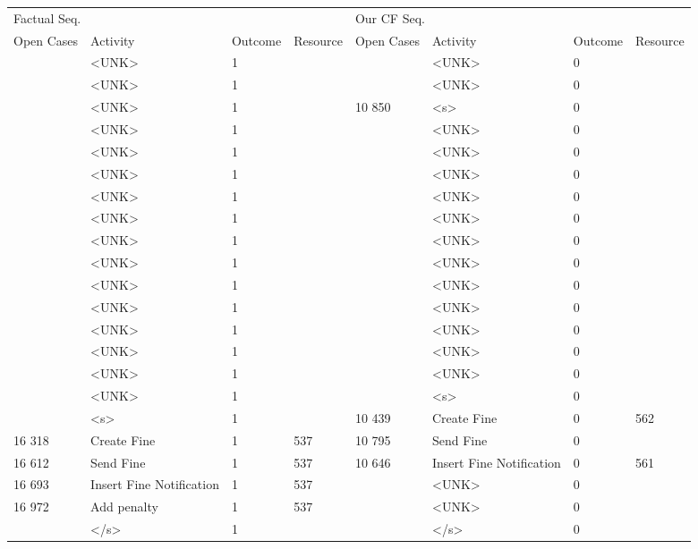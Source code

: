 \begin{tabular}{llllllll}
\toprule
\multicolumn{4}{l}{Factual Seq.} & \multicolumn{4}{l}{Our CF Seq.} \\
Open Cases & Activity & Outcome & Resource & Open Cases & Activity & Outcome & Resource \\
\midrule
 & <UNK> & 1 &  &  & <UNK> & 0 &  \\
 & <UNK> & 1 &  &  & <UNK> & 0 &  \\
 & <UNK> & 1 &  & 10 850 & <s> & 0 &  \\
 & <UNK> & 1 &  &  & <UNK> & 0 &  \\
 & <UNK> & 1 &  &  & <UNK> & 0 &  \\
 & <UNK> & 1 &  &  & <UNK> & 0 &  \\
 & <UNK> & 1 &  &  & <UNK> & 0 &  \\
 & <UNK> & 1 &  &  & <UNK> & 0 &  \\
 & <UNK> & 1 &  &  & <UNK> & 0 &  \\
 & <UNK> & 1 &  &  & <UNK> & 0 &  \\
 & <UNK> & 1 &  &  & <UNK> & 0 &  \\
 & <UNK> & 1 &  &  & <UNK> & 0 &  \\
 & <UNK> & 1 &  &  & <UNK> & 0 &  \\
 & <UNK> & 1 &  &  & <UNK> & 0 &  \\
 & <UNK> & 1 &  &  & <UNK> & 0 &  \\
 & <UNK> & 1 &  &  & <s> & 0 &  \\
 & <s> & 1 &  & 10 439 & Create Fine & 0 & 562 \\
16 318 & Create Fine & 1 & 537 & 10 795 & Send Fine & 0 &  \\
16 612 & Send Fine & 1 & 537 & 10 646 & Insert Fine Notification & 0 & 561 \\
16 693 & Insert Fine Notification & 1 & 537 &  & <UNK> & 0 &  \\
16 972 & Add penalty & 1 & 537 &  & <UNK> & 0 &  \\
 & </s> & 1 &  &  & </s> & 0 &  \\
\bottomrule
\end{tabular}
